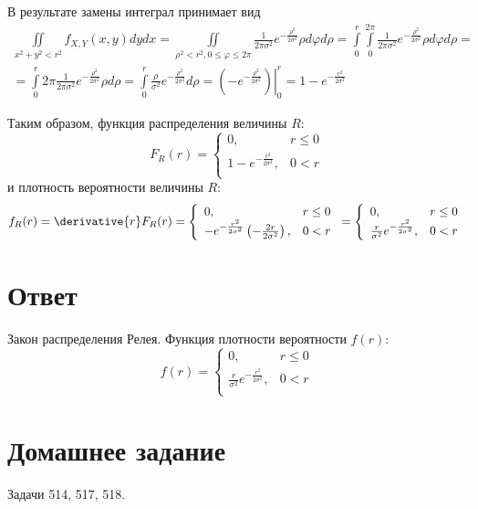 \documentclass[a4paper,12pt]{article}
\begin{document}
    В результате замены интеграл принимает вид
    \begin{multline}
        \iint \limits_{x^2 + y^2 < r^2} f_{X,Y}(x, y) dy dx
        = \iint \limits_{\rho^2 < r^2, 0 \le \varphi \le 2 \pi} \frac{1}{2 \pi \sigma^2} e^{- \frac{\rho^2}{2 \sigma^2}} \rho d \varphi d \rho
        = \int \limits_0^{r} \int \limits_0^{2 \pi} \frac{1}{2 \pi \sigma^2} e^{- \frac{\rho^2}{2 \sigma^2}} \rho d \varphi d \rho = \\
        = \int \limits_0^{r} 2 \pi \frac{1}{2 \pi \sigma^2} e^{- \frac{\rho^2}{2 \sigma^2}} \rho d \rho
        = \int \limits_0^{r} \frac{\rho}{\sigma^2} e^{- \frac{\rho^2}{2 \sigma^2}} d \rho
        = \left . \left ( - e^{- \frac{\rho^2}{2 \sigma^2}} \right ) \right |_0^{r}
        = 1 - e^{-\frac{r^2}{2 \sigma^2}}
    \end{multline}

    Таким образом, функция распределения величины $R$:
    \begin{equation}
        F_R(r)
        = \left \{
        \begin{array}{ll}
            0,                               & r \le 0 \\
            1 - e^{-\frac{r^2}{2 \sigma^2}}, & 0 < r   \\
        \end{array}
        \right .
    \end{equation}
    и плотность вероятности величины $R$:
    \begin{equation}
        f_R(r)
        = \derivative{r} F_R(r)
        = \left \{
        \begin{array}{ll}
            0,                                                                       & r \le 0 \\
            - e^{-\frac{r^2}{2 \sigma^2}} \left ( - \frac{2 r}{2 \sigma^2} \right ), & 0 < r   \\
        \end{array}
        \right .
        = \left \{
        \begin{array}{ll}
            0,                                              & r \le 0 \\
            \frac{r}{\sigma^2} e^{-\frac{r^2}{2 \sigma^2}}, & 0 < r   \\
        \end{array}
        \right .
    \end{equation}
    \section*{Ответ}
    Закон распределения Релея. Функция плотности вероятности $f(r)$:
    $$
    f(r)
    = \left \{
    \begin{array}{ll}
        0,                                              & r \le 0 \\
        \frac{r}{\sigma^2} e^{-\frac{r^2}{2 \sigma^2}}, & 0 < r   \\
    \end{array}
    \right .
    $$


    \section{Домашнее задание}

    Задачи 514, 517, 518.
\end{document}
